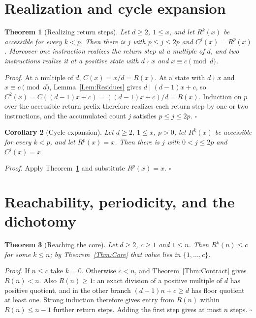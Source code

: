 \documentclass[11pt,letterpaper]{article}
\newtheorem{theorem}{Theorem}
\newtheorem{corollary}[theorem]{Corollary}
\newenvironment{proof}{\noindent\textit{Proof.}}{\hfill\(\square\)}
\begin{document}
\section{Realization and cycle expansion}

\begin{theorem}[Realizing return steps]\label{Thm:Realize}
Let \(d\ge2\), \(1\le x\), and let \(R^{k}(x)\) be accessible for every
\(k<p\). Then there is \(j\) with \(p\le j\le 2p\) and
\(C^{j}(x)=R^{p}(x)\). Moreover one instruction realizes the return step at a
multiple of \(d\), and two instructions realize it at a positive state with
\(d\nmid x\) and \(x\equiv c\pmod d\).
\end{theorem}

\begin{proof}
At a multiple of \(d\), \(C(x)=x/d=R(x)\). At a state with \(d\nmid x\) and
\(x\equiv c\pmod d\), Lemma~\ref{Lem:Residues} gives \(d\mid(d-1)x+c\), so
\(C^{2}(x)=C((d-1)x+c)=((d-1)x+c)/d=R(x)\). Induction on \(p\) over the
accessible return prefix therefore realizes each return step by one or two
instructions, and the accumulated count \(j\) satisfies \(p\le j\le2p\).
\end{proof}

\begin{corollary}[Cycle expansion]\label{Cor:Expand}
Let \(d\ge2\), \(1\le x\), \(p>0\), let \(R^{k}(x)\) be accessible for every
\(k<p\), and let \(R^{p}(x)=x\). Then there is \(j\) with \(0<j\le2p\) and
\(C^{j}(x)=x\).
\end{corollary}

\begin{proof}
Apply Theorem~\ref{Thm:Realize} and substitute \(R^{p}(x)=x\).
\end{proof}

\section{Reachability, periodicity, and the dichotomy}

\begin{theorem}[Reaching the core]\label{Thm:Reach}
Let \(d\ge2\), \(c\ge1\) and \(1\le n\). Then \(R^{k}(n)\le c\) for some
\(k\le n\); by Theorem~\ref{Thm:Core} that value lies in
\(\{1,\dots,c\}\).
\end{theorem}

\begin{proof}
If \(n\le c\) take \(k=0\). Otherwise \(c<n\), and
Theorem~\ref{Thm:Contract} gives \(R(n)<n\). Also \(R(n)\ge1\): an exact
division of a positive multiple of \(d\) has positive quotient, and in the
other branch \((d-1)n+c\ge d\) has floor quotient at least one.
Strong induction therefore gives entry from \(R(n)\) within \(R(n)\le n-1\)
further return steps. Adding the first step gives at most \(n\) steps.
\end{proof}
\end{document}
